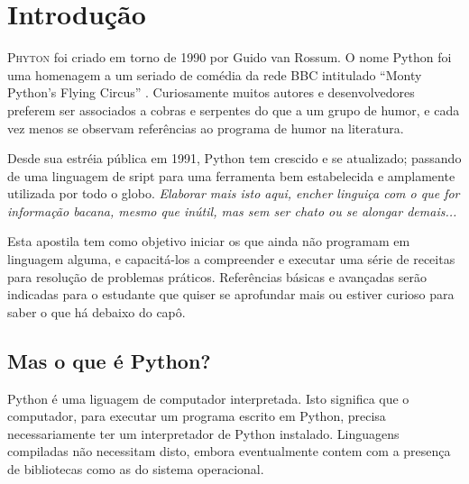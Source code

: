 \documentclass[
	12pt,				%
	openright,			%
	twoside,			%
	a4paper,			%
	english,			%
	french,				%
	brazil,				%
	sumario=tradicional
]{abntex2}
\renewcommand{\textual}{%
  \pagestyle{abntbookheadings}%
  \aliaspagestyle{chapter}{abntbookchapfirst}%
  \nouppercaseheads%
  \bookmarksetup{startatroot}%
}
\begin{document}
\listoffigures*
\cleardoublepage

\listoftables*
\cleardoublepage

\tableofcontents*
\cleardoublepage

\mainmatter
\OnehalfSpacing
\chapter*[Introdução]{Introdução} %

\lettrine[nindent=0.35em,lhang=0.40,loversize=0.3]{P}{hyton} foi criado em torno de 1990 por
 Guido van Rossum.
O nome Python foi uma homenagem a um seriado de comédia da rede BBC intitulado
 ``Monty Python's Flying Circus''%
  \cite{Lutz}. 
 Curiosamente muitos autores e desenvolvedores preferem ser associados a cobras e serpentes 
 do que a um grupo de humor, e cada vez menos se observam referências ao programa de humor na literatura.

Desde sua estréia pública em 1991, Python tem crescido e se atualizado;
 passando de uma linguagem de sript para uma ferramenta bem estabelecida e 
 amplamente utilizada por todo o globo. 
 \emph{Elaborar mais isto aqui, encher linguiça com o que for informação bacana, 
 mesmo que inútil, mas sem ser chato ou se alongar demais...}

Esta apostila tem como objetivo iniciar os que ainda não programam em linguagem alguma,
e capacitá-los a compreender e executar uma série de receitas para resolução de problemas práticos.
Referências básicas e avançadas serão indicadas para o estudante que quiser se aprofundar mais
ou estiver curioso para saber o que há debaixo do capô.

\section[Mas o que é Python?] {Mas o que é Python?}%
Python é uma liguagem de computador interpretada. 
Isto significa que o computador, para executar um programa escrito em Python,
precisa necessariamente ter um interpretador de Python instalado. 
Linguagens compiladas não necessitam disto, embora eventualmente contem com a presença de 
bibliotecas como as do sistema operacional.
\end{document}
